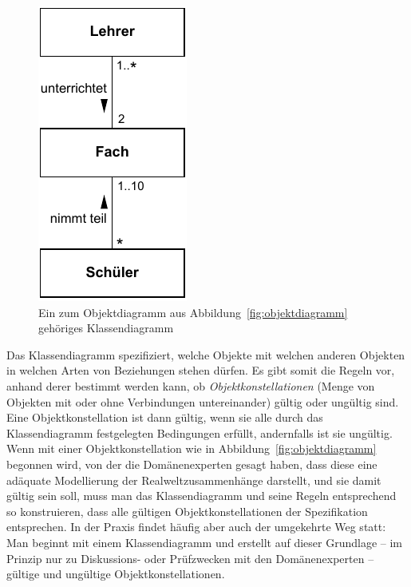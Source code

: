 \vspace{\baselineskip} %
\vspace{\baselineskip} %

\begin{figure}[h!]
	\centering
	\includegraphics{Bilder/Kapitel-4/klassendiagramm_lehrer_fach_schueler.pdf}
	\caption[Ein zum Objektdiagramm aus Abb.~\ref{fig:objektdiagramm} gehöriges Klassen\-diagramm]{Ein zum Objektdiagramm aus Abbildung~\ref{fig:objektdiagramm} gehöriges Klassen\-diagramm}
	\label{fig:klassendiagramm_zu_objektdiagramm}
\end{figure}

\vspace{\baselineskip} %

Das Klassendiagramm spezifiziert, welche Objekte mit welchen anderen Objekten in welchen Arten von Beziehungen stehen dürfen. Es gibt somit die Regeln vor, anhand derer bestimmt werden kann, ob 
\textit{Objektkonstellationen} (Menge von Objekten mit oder ohne Verbindungen untereinander) gültig oder ungültig sind. Eine Objektkonstellation ist dann gültig, wenn sie alle durch das Klassendiagramm festgelegten Bedingungen erfüllt, andernfalls ist sie ungültig. Wenn mit einer Objekt\-konstel\-la\-tion wie in Abbildung~\ref{fig:objektdiagramm} begonnen wird, von der die Domänenexperten gesagt haben, dass diese eine adäquate Modellierung der Realweltzusammenhänge darstellt, und sie damit gültig sein soll, muss man das Klassendiagramm und seine Regeln ent\-sprechend so konstruieren, dass alle gültigen Objektkonstellationen der Spezi\-fi\-kation entsprechen. In der Praxis findet häufig aber auch der umgekehrte Weg statt: Man beginnt mit einem Klassendiagramm und erstellt auf dieser Grundlage – im Prinzip nur zu Diskussions- oder Prüfzwecken mit den Domänenexperten – gültige und ungültige Objektkonstellationen.

